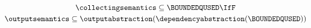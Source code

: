 \begin{gather*}
    \collectingsemantics \subseteq \BOUNDEDQUSED
    \IfF \\
    \outputsemantics \subseteq \outputabstraction(\dependencyabstraction(\BOUNDEDQUSED))
  \end{gather*}
